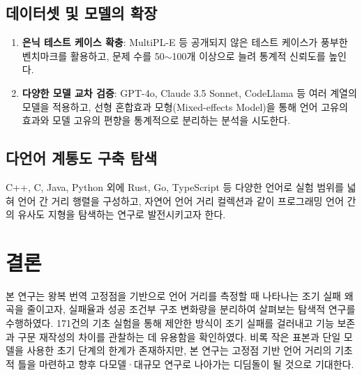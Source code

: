 \documentclass[a4paper,10pt,twocolumn,twoside]{article}
\begin{document}
\subsection{데이터셋 및 모델의 확장}
\begin{enumerate}
\item \textbf{은닉 테스트 케이스 확충}: MultiPL-E\cite{multiple} 등 공개되지 않은 테스트 케이스가 풍부한 벤치마크를 활용하고, 문제 수를 50$\sim$100개 이상으로 늘려 통계적 신뢰도를 높인다.
\item \textbf{다양한 모델 교차 검증}: GPT-4o, Claude 3.5 Sonnet, CodeLlama 등 여러 계열의 모델을 적용하고, 선형 혼합효과 모형(Mixed-effects Model)을 통해 언어 고유의 효과와 모델 고유의 편향을 통계적으로 분리하는 분석을 시도한다.
\end{enumerate}

\subsection{다언어 계통도 구축 탐색}
C++, C, Java, Python 외에 Rust, Go, TypeScript 등 다양한 언어로 실험 범위를 넓혀 언어 간 거리 행렬을 구성하고, 자연어 언어 거리 컬렉션\cite{distals}과 같이 프로그래밍 언어 간의 유사도 지형을 탐색하는 연구로 발전시키고자 한다.

\section{결론}

본 연구는 왕복 번역 고정점을 기반으로 언어 거리를 측정할 때 나타나는 조기 실패 왜곡을 줄이고자, 실패율과 성공 조건부 구조 변화량을 분리하여 살펴보는 탐색적 연구를 수행하였다. 171건의 기초 실험을 통해 제안한 방식이 조기 실패를 걸러내고 기능 보존과 구문 재작성의 차이를 관찰하는 데 유용함을 확인하였다. 비록 작은 표본과 단일 모델을 사용한 초기 단계의 한계가 존재하지만, 본 연구는 고정점 기반 언어 거리의 기초적 틀을 마련하고 향후 다모델·대규모 연구로 나아가는 디딤돌이 될 것으로 기대한다.

\nocite{*}


\end{document}
